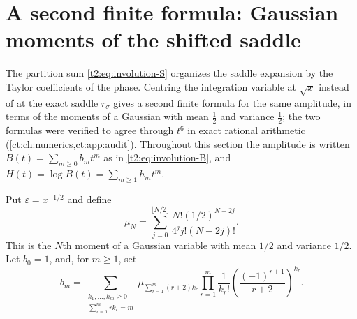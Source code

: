 \documentclass[11pt,openany]{book}
\numberwithin{equation}{chapter}
\theoremstyle{plain}
\theoremstyle{definition}
\theoremstyle{remark}
\begin{document}
\section{A second finite formula: Gaussian moments of the shifted saddle}
\label{ct:sec:inv-second}

The partition sum \cref{t2:eq:involution-S} organizes the saddle expansion
by the Taylor coefficients of the phase.  Centring the integration variable
at $\sqrt x$ instead of at the exact saddle $r_\sigma$ gives a second finite
formula for the same amplitude, in terms of the moments of a Gaussian with
mean $\tfrac12$ and variance $\tfrac12$; the two formulas were verified to
agree through $t^6$ in exact rational arithmetic
(\cref{ct:ch:numerics,ct:app:audit}).  Throughout this section the
amplitude is written $B(t)=\sum_{m\ge0}b_mt^m$ as in
\cref{t2:eq:involution-B}, and $H(t)=\log B(t)=\sum_{m\ge1}h_mt^m$.

Put $\varepsilon=x^{-1/2}$ and define
\begin{equation}
 \mu_N=\sum_{j=0}^{\lfloor N/2\rfloor}
 \frac{N!(1/2)^{N-2j}}{4^j j!(N-2j)!}.
 \label{t1:eq:ivmu}
\end{equation}
This is the $N$th moment of a Gaussian variable with mean $1/2$ and variance $1/2$. Let $b_0=1$, and, for $m\ge1$, set
\begin{equation}
 b_m=\sum_{\substack{k_1,\ldots,k_m\ge0\\\sum_{r=1}^m r k_r=m}}
 \mu_{\sum_{r=1}^m(r+2)k_r}
 \prod_{r=1}^m\frac{1}{k_r!}
 \left(\frac{(-1)^{r+1}}{r+2}\right)^{k_r}.
 \label{t1:eq:ivcoeff}
\end{equation}
\end{document}
